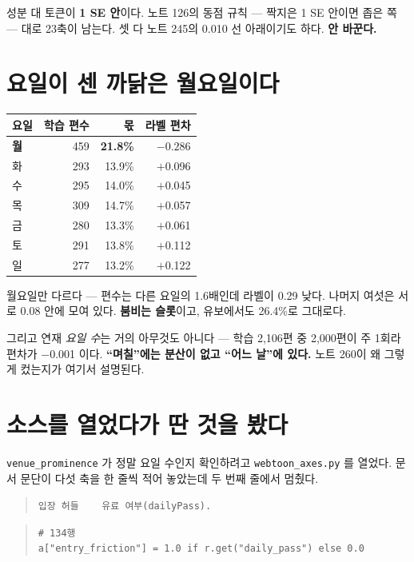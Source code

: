 \documentclass[10pt]{article}
\begin{document}
성분 대 토큰이 \textbf{1 SE 안}이다. 노트 126의 동점 규칙 --- 짝지은 1 SE
안이면 좁은 쪽 --- 대로 23축이 남는다. 셋 다 노트 245의 0.010 선 아래이기도
하다. \textbf{안 바꾼다.}

\section{요일이 센 까닭은 월요일이다}

\begin{center}\small
\begin{tabular}{lrrr}
\hline
요일 & 학습 편수 & 몫 & 라벨 편차 \\
\hline
\textbf{월} & 459 & \textbf{21.8\%} & $\mathbf{-0.286}$ \\
화 & 293 & 13.9\% & $+$0.096 \\
수 & 295 & 14.0\% & $+$0.045 \\
목 & 309 & 14.7\% & $+$0.057 \\
금 & 280 & 13.3\% & $+$0.061 \\
토 & 291 & 13.8\% & $+$0.112 \\
일 & 277 & 13.2\% & $+$0.122 \\
\hline
\end{tabular}
\end{center}

월요일만 다르다 --- 편수는 다른 요일의 1.6배인데 라벨이 0.29 낮다. 나머지
여섯은 서로 0.08 안에 모여 있다. \textbf{붐비는 슬롯}이고, 유보에서도
26.4\%로 그대로다.

그리고 연재 \emph{요일 수}는 거의 아무것도 아니다 --- 학습 2,106편 중
2,000편이 주 1회라 편차가 $-$0.001 이다. \textbf{``며칠''에는 분산이 없고
``어느 날''에 있다.} 노트 260이 왜 그렇게 컸는지가 여기서 설명된다.

\section{소스를 열었다가 딴 것을 봤다}

\texttt{venue\_prominence} 가 정말 요일 수인지 확인하려고
\texttt{webtoon\_axes.py} 를 열었다. 문서 문단이 다섯 축을 한 줄씩 적어
놓았는데 두 번째 줄에서 멈췄다.

\begin{quote}\small
\texttt{입장 허들\ \ \ \ 유료 여부(dailyPass).}
\end{quote}

\begin{quote}\small
\texttt{\# 134행} \\
\texttt{a["entry\_friction"] = 1.0 if r.get("daily\_pass") else 0.0}
\end{quote}
\end{document}
